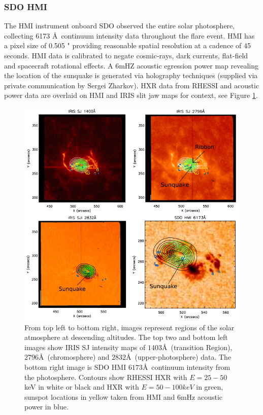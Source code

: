 \subsubsection{SDO HMI}
The HMI instrument onboard SDO observed the entire solar photosphere, collecting 6173 \AA\ continuum intensity data throughout the flare event. HMI has a pixel size of 0.505 " providing reasonable spatial resolution at a cadence of 45 seconds. HMI data is calibrated to negate cosmic-rays, dark currents, flat-field and spacecraft rotational effects. A 6mHZ acoustic egression power map revealing the location of the sunquake is generated via holography techniques (supplied via private communication by Sergei Zharkov). HXR data from RHESSI and acoustic power data are overlaid on HMI and IRIS slit jaw maps for context, see Figure \ref{saxcontours-vert}.\\

\begin{figure}[H]
  \begin{center}
  \includegraphics[width=1.0\textwidth]{saxcontours-square}
  \end{center}
  \caption{From top left to bottom right, images represent regions of the solar atmosphere at descending altitudes. The top two and bottom left images show IRIS SJ intensity maps of $1403$\AA\ (transition Region), $2796$\AA\ (chromosphere) and $2832$\AA\ (upper-photosphere) data. The bottom right image is SDO HMI $6173$\AA\ continuum intensity from the photosphere. Contours show RHESSI HXR with $E = 25-50$ keV in white or black and HXR with $E = 50-100 keV$ in green, sunspot locations in yellow taken from HMI and 6mHz acoustic power in blue.}\label{saxcontours-vert}
\end{figure}


